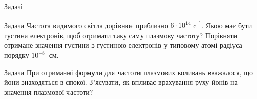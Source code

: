 \documentclass[]{beamer}
\newcounter{probcnt}
\begin{document}
\begin{frame}{Задачі}{}
\begin{overprint}

		\begin{exampleblock}{\scriptsize Задача \theprobcnt}\justifying\scriptsize
			Частота видимого світла дорівнює приблизно $6\cdot10^{14}$ c\textsuperscript{-1}. Якою має бути густина електронів, щоб отримати таку саму плазмову
			частоту? Порівняти отримане значення густини з густиною
			електронів у типовому атомі радіуса порядку $10^{-8}$~см.
		\end{exampleblock}

		\begin{exampleblock}{\scriptsize Задача \theprobcnt}\justifying\scriptsize
			При отриманні формули для частоти плазмових коливань вважалося,
			що йони знаходяться в спокої. З'ясувати, як впливає врахування руху йонів на значення плазмової частоти?
		\end{exampleblock}

	\end{overprint}
\end{frame}
\end{document}
